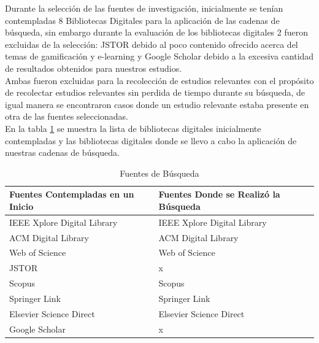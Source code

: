 \documentclass{report}
\begin{document}
            Durante la selección de las fuentes de investigación, inicialmente se tenían contempladas 8 Bibliotecas Digitales para la aplicación de las cadenas de búsqueda, sin embargo durante la evaluación de los bibliotecas digitales 2 fueron excluidas de la selección: JSTOR debido al poco contenido ofrecido acerca del temas de gamificación y e-learning y Google Scholar debido a la excesiva cantidad de resultados obtenidos para nuestros estudios.\\
            Ambas fueron excluidas para la recolección de estudios relevantes con el propósito de recolectar estudios relevantes sin perdida de tiempo durante su búsqueda, de igual manera se encontraron casos donde un estudio relevante estaba presente en otra de las fuentes seleccionadas.\\ En la tabla \ref{table:libraries} se muestra la lista de bibliotecas digitales inicialmente contempladas y las bibliotecas digitales donde se llevo a cabo la aplicación de nuestras cadenas de búsqueda.
            \begin{table}
                \begin{center}
                    \caption{Fuentes de Búsqueda}
                    \label{table:libraries}
                    \begin{tabular}{| p{7cm} | p{7cm} |}
                        \toprule
                        \hline
                        \textbf {Fuentes Contempladas en un Inicio} &  \textbf{Fuentes Donde se Realizó la Búsqueda}\\
                        \hline
                        IEEE Xplore Digital Library & IEEE Xplore Digital Library\\
                        \hline
                        ACM Digital Library & ACM Digital Library\\
                        \hline
                        Web of Science & Web of Science\\
                        \hline
                        JSTOR & x\\
                        \hline
                        Scopus & Scopus\\
                        \hline
                        Springer Link & Springer Link\\
                        \hline
                        Elsevier Science Direct & Elsevier Science Direct\\
                        \hline
                        Google Scholar & x\\
                        \hline
                    \end{tabular}
                \end{center}
            \end{table}
            
\end{document}
